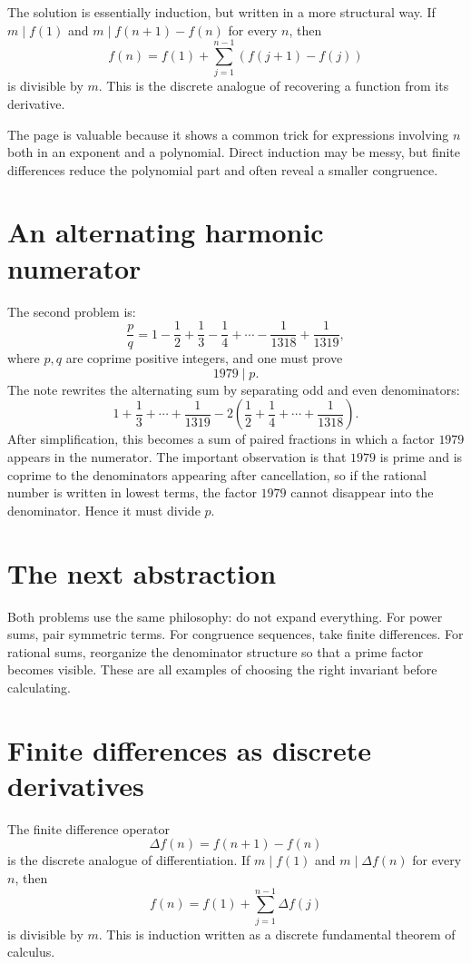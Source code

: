 The solution is essentially induction, but written in a more structural way.  If \(m\mid f(1)\) and \(m\mid f(n+1)-f(n)\) for every \(n\), then
\[
  f(n)=f(1)+\sum_{j=1}^{n-1}(f(j+1)-f(j))
\]
is divisible by \(m\).  This is the discrete analogue of recovering a function from its derivative.

The page is valuable because it shows a common trick for expressions involving \(n\) both in an exponent and a polynomial.  Direct induction may be messy, but finite differences reduce the polynomial part and often reveal a smaller congruence.

\section{An alternating harmonic numerator}

The second problem is:
\[
  \frac pq=1-\frac12+\frac13-\frac14+\cdots-\frac1{1318}+\frac1{1319},
\]
where \(p,q\) are coprime positive integers, and one must prove
\[
  1979\mid p.
\]
The note rewrites the alternating sum by separating odd and even denominators:
\[
  1+\frac13+\cdots+\frac1{1319}
  -2\left(\frac12+\frac14+\cdots+\frac1{1318}\right).
\]
After simplification, this becomes a sum of paired fractions in which a factor \(1979\) appears in the numerator.  The important observation is that \(1979\) is prime and is coprime to the denominators appearing after cancellation, so if the rational number is written in lowest terms, the factor \(1979\) cannot disappear into the denominator.  Hence it must divide \(p\).

\section{The next abstraction}

Both problems use the same philosophy: do not expand everything.  For power sums, pair symmetric terms.  For congruence sequences, take finite differences.  For rational sums, reorganize the denominator structure so that a prime factor becomes visible.  These are all examples of choosing the right invariant before calculating.

\section{Finite differences as discrete derivatives}

The finite difference operator
\[
  \Delta f(n)=f(n+1)-f(n)
\]
is the discrete analogue of differentiation.  If \(m\mid f(1)\) and \(m\mid \Delta f(n)\) for every \(n\), then
\[
  f(n)=f(1)+\sum_{j=1}^{n-1}\Delta f(j)
\]
is divisible by \(m\).  This is induction written as a discrete fundamental theorem of calculus.

